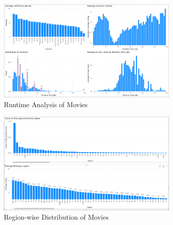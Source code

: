 \documentclass[a4paper,12pt]{article}
\begin{document}
\begin{figure}[H]
    \centering
    \includegraphics[width=0.8\textwidth]{../assets/movies_runtime.png}
    \caption{Runtime Analysis of Movies}
    \label{fig:movies_runtime}
\end{figure}

\begin{figure}[H]
    \centering
    \includegraphics[width=0.8\textwidth]{../assets/movies_region.png}
    \caption{Region-wise Distribution of Movies}
    \label{fig:movies_region}
\end{figure}

\end{document}
